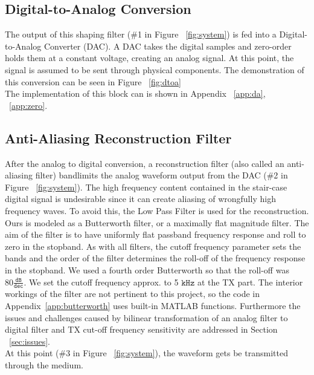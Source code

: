 \documentclass[]{article}
\begin{document}
\subsection{Digital-to-Analog Conversion}
\label{sec:da}

The output of this shaping filter (\#1 in Figure ~\ref{fig:system}) is fed into a Digital-to-Analog Converter (DAC).  A DAC takes the digital samples and zero-order holds them at a constant voltage, creating an analog signal. At this point, the signal is assumed to be sent through physical components. The demonstration of this conversion can be seen in Figure ~\ref{fig:dtoa} \\

The implementation of this block can is shown in Appendix ~\ref{app:da}, ~\ref{app:zero}.

\subsection{Anti-Aliasing Reconstruction Filter}
\label{sec:reconstruction}
After the analog to digital conversion, a reconstruction filter (also called an anti-aliasing filter) bandlimits the analog waveform output from the DAC (\#2 in Figure ~\ref{fig:system}).  The high frequency content contained in the stair-case digital signal is undesirable since it can create aliasing of wrongfully high frequency waves. To avoid this, the Low Pass Filter is used for the reconstruction.  Ours is modeled as a Butterworth filter, or a maximally flat magnitude filter.  The aim of the filter is to have uniformly flat passband frequency response and roll to zero in the stopband.  As with all filters, the cutoff frequency parameter sets the bands and the order of the filter determines the roll-off of the frequency response in the stopband.  We used a fourth order Butterworth so that the roll-off was $80 \mathtt{\frac{dB}{dec}}$.  We set the cutoff frequency approx. to 5 $\mathtt{kHz}$ at the TX part. The interior workings of the filter are not pertinent to this project, so the code in Appendix~\ref{app:butterworth} uses built-in MATLAB functions. Furthermore the issues and challenges caused by bilinear transformation of an analog filter to digital filter and TX cut-off frequency sensitivity are addressed in Section ~\ref{sec:issues}. \\

At this point (\#3 in Figure ~\ref{fig:system}), the waveform gets be transmitted through the medium. \\
\end{document}
